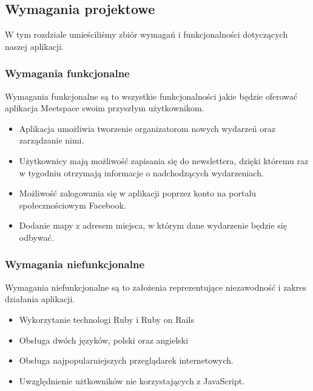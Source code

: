 

\subsection{Wymagania projektowe}
W tym rozdziale umieściliśmy zbiór wymagań i funkcjonalności dotyczących naszej aplikacji.
  \subsubsection{Wymagania funkcjonalne}
    Wymagania funkcjonalne są to wszystkie funkcjonalności jakie będzie oferować aplikacja Meetspace swoim przyszłym użytkownikom.
    \begin{itemize}
      \item Aplikacja umożliwia tworzenie organizatorom nowych wydarzeń oraz zarządzanie nimi.
      \item Użytkownicy mają możliwość zapisania się do newslettera, dzięki któremu raz w tygodniu otrzymają informacje o nadchodzących wydarzeniach.
      \item Możliwość zalogowania się w aplikacji poprzez konto na portalu społecznościowym Facebook.
      \item Dodanie mapy z adresem miejsca, w którym dane wydarzenie będzie się odbywać.
    \end{itemize}
  \subsubsection{Wymagania niefunkcjonalne}
  Wymagania niefunkcjonalne są to założenia reprezentujące niezawodność i zakres działania aplikacji.
    \begin{itemize}
      \item Wykorzytanie technologi Ruby i Ruby on Rails
      \item Obsługa dwóch języków, polski oraz angielski
      \item Obsługa najpopularniejszych przeglądarek internetowych.
      \item Uwzględnienie użtkowników nie korzystających z JavaScript.
    \end{itemize}

